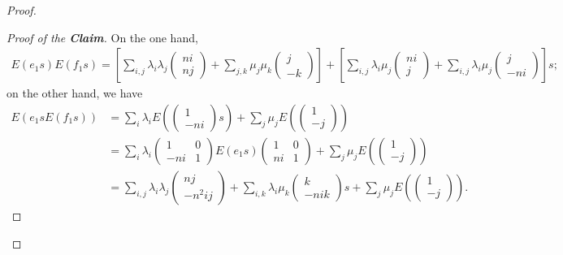 \documentclass[12pt]{amsart}
\theoremstyle{definition}
\theoremstyle{remark}
\begin{document}
\begin{proof}
\begin{proof}[Proof of the \textbf{Claim}]
On the one hand, 
\begin{align*}
E(e_1s)E(f_1s)=[\sum_{i, j}\lambda_i\lambda_j\begin{pmatrix}
ni\\
nj
\end{pmatrix}+\sum_{j, k}\mu_j\mu_k\begin{pmatrix}
j\\
-k
\end{pmatrix}]+[\sum_{i,j}\lambda_i\mu_j\begin{pmatrix}
ni\\
j
\end{pmatrix}+\sum_{i, j}\lambda_i\mu_j\begin{pmatrix}
j\\
-ni
\end{pmatrix}]s;
\end{align*}
on the other hand, we have
\begin{align*}
E(e_1sE(f_1s))&=\sum_i\lambda_iE(\begin{pmatrix}
1\\
-ni
\end{pmatrix}s)+\sum_j\mu_jE(\begin{pmatrix}
1\\
-j
\end{pmatrix})\\
&=\sum_i\lambda_i\begin{pmatrix}
1&0\\
-ni&1
\end{pmatrix}E(e_1s)\begin{pmatrix}
1&0\\
ni&1
\end{pmatrix}+\sum_j\mu_jE(\begin{pmatrix}
1\\
-j
\end{pmatrix})\\
&=\sum_{i,j}\lambda_i\lambda_j\begin{pmatrix}
nj\\
-n^2ij
\end{pmatrix}+\sum_{i, k}\lambda_i\mu_k\begin{pmatrix}
k\\
-nik
\end{pmatrix}s+\sum_j\mu_jE(\begin{pmatrix}
1\\
-j
\end{pmatrix}).
\end{align*}




\end{proof}
\end{proof}
\end{document}
